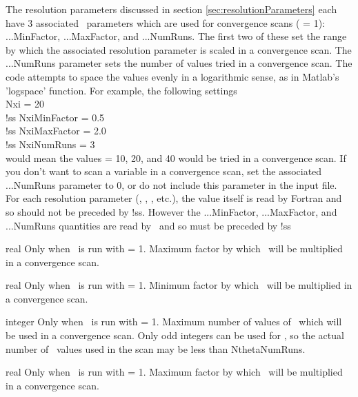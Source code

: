 The resolution parameters discussed in section \ref{sec:resolutionParameters}
each have 3 associated \sfincsScan~parameters
which are used for convergence scans ( = 1): {\ttfamily ...MinFactor}, {\ttfamily ...MaxFactor}, and {\ttfamily ...NumRuns}.
The first two of these set the range by which the associated resolution parameter is scaled
in a convergence scan. The {\ttfamily ...NumRuns} parameter sets the number of values tried in a
convergence scan. The code attempts to space the values evenly in a logarithmic
sense, as in Matlab's 'logspace' function. For example, the following settings\\
{\ttfamily
    Nxi = 20\\
!ss NxiMinFactor = 0.5\\
!ss NxiMaxFactor = 2.0\\
!ss NxiNumRuns = 3\\
}
would mean the values \Nxi = 10, 20, and 40 would be tried in a convergence scan.
If you don't want to scan a variable in a convergence scan, set the associated
{\ttfamily ...NumRuns} parameter to 0, or do not include this parameter in the input file.
For each resolution parameter (\Ntheta, \Nzeta, \Nxi, etc.), the value itself is read by
Fortran and so should not be preceded by {\ttfamily !ss}.  However the {\ttfamily ...MinFactor}, {\ttfamily ...MaxFactor}, and {\ttfamily ...NumRuns}
quantities are read by \sfincsScan~and so must be preceded by {\ttfamily !ss}

\myhrule

{real}
{Only when \sfincsScan~is run with  = 1.}
{Maximum factor by which \Ntheta~will be multiplied in a convergence scan.}

\myhrule

{real}
{Only when \sfincsScan~is run with  = 1.}
{Minimum factor by which \Ntheta~will be multiplied in a convergence scan.}

\myhrule

{integer}
{Only when \sfincsScan~is run with  = 1.}
{Maximum number of values of \Ntheta~which will be used in a convergence scan.  Only odd integers can be used
for \Ntheta, so the actual number of \Ntheta~values used in the scan may be less than {\ttfamily NthetaNumRuns}.}

\myhrule

{real}
{Only when \sfincsScan~is run with  = 1.}
{Maximum factor by which \Nzeta~will be multiplied in a convergence scan.}

